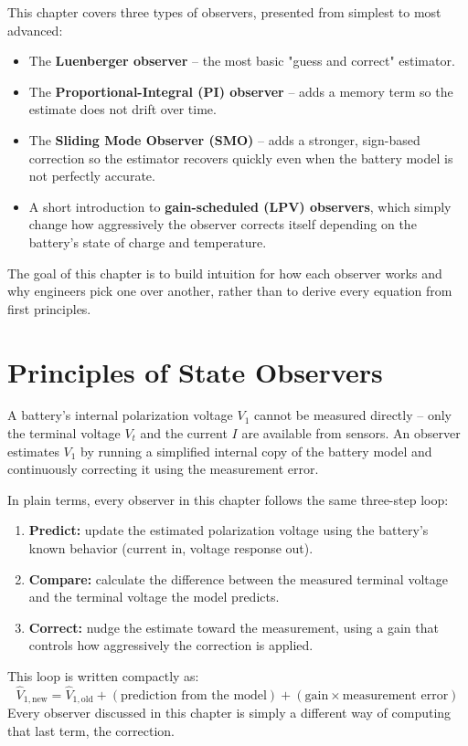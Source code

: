 This chapter covers three types of observers, presented from simplest to most advanced:
\begin{itemize}
    \item The \textbf{Luenberger observer} -- the most basic "guess and correct" estimator.
    \item The \textbf{Proportional-Integral (PI) observer} -- adds a memory term so the estimate does not drift over time.
    \item The \textbf{Sliding Mode Observer (SMO)} -- adds a stronger, sign-based correction so the estimator recovers quickly even when the battery model is not perfectly accurate.
    \item A short introduction to \textbf{gain-scheduled (LPV) observers}, which simply change how aggressively the observer corrects itself depending on the battery's state of charge and temperature.
\end{itemize}
The goal of this chapter is to build intuition for how each observer works and why engineers pick one over another, rather than to derive every equation from first principles.


\section{Principles of State Observers}
\label{sec:observer_principles}

A battery's internal polarization voltage $V_1$ cannot be measured directly -- only the terminal voltage $V_t$ and the current $I$ are available from sensors. An observer estimates $V_1$ by running a simplified internal copy of the battery model and continuously correcting it using the measurement error.

In plain terms, every observer in this chapter follows the same three-step loop:
\begin{enumerate}
    \item \textbf{Predict:} update the estimated polarization voltage using the battery's known behavior (current in, voltage response out).
    \item \textbf{Compare:} calculate the difference between the measured terminal voltage and the terminal voltage the model predicts.
    \item \textbf{Correct:} nudge the estimate toward the measurement, using a gain that controls how aggressively the correction is applied.
\end{enumerate}

This loop is written compactly as:
\begin{equation}
\hat{V}_{1,\text{new}} = \hat{V}_{1,\text{old}} + (\text{prediction from the model}) + (\text{gain} \times \text{measurement error})
\label{eq:ch6_general_loop}
\end{equation}
Every observer discussed in this chapter is simply a different way of computing that last term, the correction.

